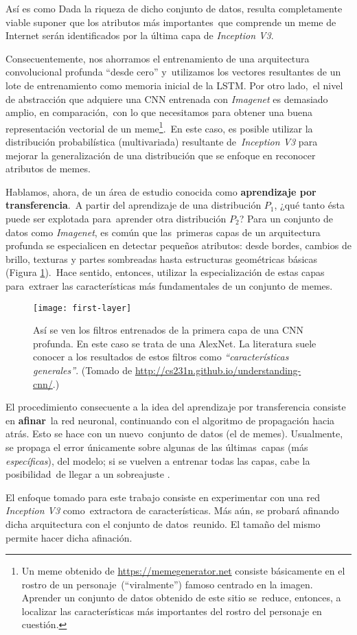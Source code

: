 Así es como
Dada la riqueza de dicho conjunto de datos, resulta completamente viable suponer que los atributos más importantes\
que comprende un meme de Internet serán identificados por la última capa de \emph{Inception V3}.\par
Consecuentemente, nos ahorramos el entrenamiento de una arquitectura convolucional profunda ``desde cero'' y\
utilizamos los vectores resultantes de un lote de entrenamiento como memoria inicial de la LSTM. Por otro lado,\
el nivel de abstracción que adquiere una CNN entrenada con \emph{Imagenet} es demasiado amplio, en comparación,\
con lo que necesitamos para obtener una buena representación vectorial de un meme\footnote{
  Un meme obtenido de \url{https://memegenerator.net} consiste básicamente en el rostro de un personaje\
  (``viralmente'') famoso centrado en la imagen. Aprender un conjunto de datos obtenido de este sitio se\
  reduce, entonces, a localizar las características más importantes del rostro del personaje en cuestión.
}.\
En este caso, es posible utilizar la distribución probabilística (multivariada) resultante de\
\emph{Inception V3} para mejorar la generalización de una distribución que se enfoque en reconocer atributos de memes.\par
Hablamos, ahora, de un área de estudio conocida como \textbf{aprendizaje por transferencia}.\
A partir del aprendizaje de una distribución $P_1$, ¿qué tanto ésta puede ser explotada para\
aprender otra distribución $P_2$? Para un conjunto de datos como \emph{Imagenet}, es común que las\
primeras capas de un arquitectura profunda se especialicen en detectar pequeños atributos: desde bordes,
cambios de brillo, texturas y partes sombreadas hasta estructuras geométricas básicas (Figura \ref{first-layer}).\
Hace sentido, entonces, utilizar la especialización de estas capas para\
extraer las características más fundamentales de un conjunto de memes.

\begin{figure}[H]
  \centering
  \texttt{[image: first-layer]}
  \caption{
    Así se ven los filtros entrenados de la primera capa de una CNN profunda.
    En este caso se trata de una AlexNet. La literatura suele conocer a los resultados de estos
    filtros como \emph{``características generales''}.
    (Tomado de \url{http://cs231n.github.io/understanding-cnn/}.)}
  \label{first-layer}
\end{figure}

El procedimiento consecuente a la idea del aprendizaje por transferencia consiste en \textbf{afinar}\
la red neuronal, continuando con el algoritmo de propagación hacia atrás. Esto se hace con un nuevo\
conjunto de datos (el de memes). Usualmente, se propaga el error únicamente sobre algunas de las últimas\
capas (más \emph{específicas}), del modelo; si se vuelven a entrenar todas las capas, cabe la posibilidad\
de llegar a un sobreajuste \cite{DBLP:journals/corr/YosinskiCBL14}.\par
El enfoque tomado para este trabajo consiste en experimentar con una red \emph{Inception V3} como\
extractora de características. Más aún, se probará afinando dicha arquitectura con el conjunto de datos\
reunido. El tamaño del mismo permite hacer dicha afinación.


